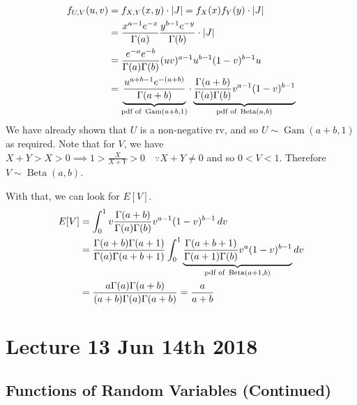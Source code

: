 \documentclass[notoc,notitlepage]{tufte-book}
\DeclareMathOperator{\Gam}{Gam }
\DeclareMathOperator{\BetaDist}{Beta }
\begin{document}
\begin{solution}
  \begin{align*}
    f_{U, V}(u, v) &= f_{X, Y}(x, y) \cdot \abs{J} = f_X(x) f_Y(y) \cdot \abs{J} \\
                   &= \frac{x^{a - 1} e^{-x}}{\Gamma(a)} \frac{y^{b - 1} e^{-y}}{\Gamma(b)} \cdot \abs{J} \\
                   &= \frac{e^{-a} e^{-b}}{\Gamma(a) \Gamma(b)} (uv)^{a - 1} u^{b - 1} ( 1 - v )^{b - 1} u \\
                   &= \underbrace{ \frac{u^{a + b - 1} e^{-(a + b)}}{\Gamma(a + b)} }_{\text{pdf of } \Gam(a + b, 1)} \cdot \underbrace{ \frac{\Gamma(a + b)}{\Gamma(a) \Gamma(b)} v^{a - 1} (1 - v)^{b - 1} }_{\text{pdf of } \BetaDist(a, b)}
  \end{align*}
  We have already shown that $U$ is a non-negative rv, and so $U \sim \Gam(a + b, 1)$ as required. Note that for $V$, we have
  $X + Y > X > 0 \implies 1 > \frac{X}{X + Y} > 0 \quad \because X + Y \neq 0$ and so $0 < V < 1$. Therefore $V \sim \BetaDist(a, b)$.

  With that, we can look for $E[V]$.
  \begin{align*}
    E[V] &= \int_{0}^{1} v \frac{\Gamma(a + b)}{\Gamma(a) \Gamma(b)} v^{a - 1} (1 - v)^{b - 1} \dif{v} \\
         &= \frac{\Gamma(a + b) \Gamma(a + 1)}{\Gamma(a) \Gamma(a + b + 1)} \int_{0}^{1} \underbrace{ \frac{\Gamma(a + b + 1)}{\Gamma(a + 1) \Gamma(b)} v^a (1 - v)^{b - 1} }_{\text{pdf of } \BetaDist(a + 1, b)} \dif{v} \\
         &= \frac{a \Gamma(a) \Gamma(a + b)}{(a + b) \Gamma(a) \Gamma(a + b)} = \frac{a}{a + b}
  \end{align*}
\end{solution}




\chapter{Lecture 13 Jun 14th 2018}%
\label{chp:lecture_13_jun_14th_2018}

\section{Functions of Random Variables (Continued)}%
\label{sec:functions_of_random_variables_continued}
\end{document}
